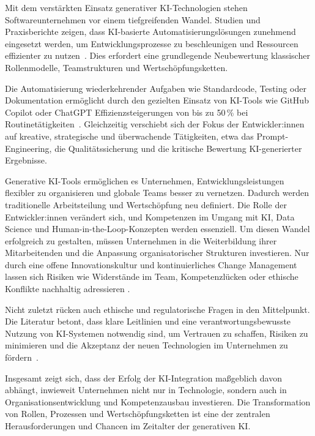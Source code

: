 Mit dem verstärkten Einsatz generativer KI-Technologien stehen
Softwareunternehmen vor einem tiefgreifenden Wandel. Studien und Praxisberichte
zeigen, dass KI-basierte Automatisierungslösungen zunehmend eingesetzt werden,
um Entwicklungsprozesse zu beschleunigen und Ressourcen effizienter zu
nutzen~\cite{siebert_generative_2024,braun_ki_2024}. Dies erfordert eine
grundlegende Neubewertung klassischer Rollenmodelle, Teamstrukturen und
Wertschöpfungsketten.

Die Automatisierung wiederkehrender Aufgaben wie Standardcode, Testing oder
Dokumentation ermöglicht durch den gezielten Einsatz von KI-Tools wie GitHub
Copilot oder ChatGPT Effizienzsteigerungen von bis zu 50\,\% bei
Routinetätigkeiten~\cite{braun_ki_2024,siebert_generative_2024}. Gleichzeitig
verschiebt sich der Fokus der Entwickler:innen auf kreative, strategische und
überwachende Tätigkeiten, etwa das Prompt-Engineering, die Qualitätssicherung
und die kritische Bewertung KI-generierter Ergebnisse.

Generative KI-Tools ermöglichen es Unternehmen, Entwicklungsleistungen
flexibler zu organisieren und globale Teams besser zu vernetzen. Dadurch werden
traditionelle Arbeitsteilung und Wertschöpfung neu definiert. Die Rolle der
Entwickler:innen verändert sich, und Kompetenzen im Umgang mit KI, Data Science
und Human-in-the-Loop-Konzepten werden essenziell. Um diesen Wandel erfolgreich
zu gestalten, müssen Unternehmen in die Weiterbildung ihrer Mitarbeitenden und
die Anpassung organisatorischer Strukturen investieren. Nur durch eine offene
Innovationskultur und kontinuierliches Change Management lassen sich Risiken
wie Widerstände im Team, Kompetenzlücken oder ethische Konflikte nachhaltig
adressieren \cite{s_future_2024}.

Nicht zuletzt rücken auch ethische und regulatorische Fragen in den
Mittelpunkt. Die Literatur betont, dass klare Leitlinien und eine
verantwortungsbewusste Nutzung von KI-Systemen notwendig sind, um Vertrauen zu
schaffen, Risiken zu minimieren und die Akzeptanz der neuen Technologien im
Unternehmen zu fördern~\cite{siebert_generative_2024}.

Insgesamt zeigt sich, dass der Erfolg der KI-Integration maßgeblich davon
abhängt, inwieweit Unternehmen nicht nur in Technologie, sondern auch in
Organisationsentwicklung und Kompetenzausbau investieren. Die Transformation
von Rollen, Prozessen und Wertschöpfungsketten ist eine der zentralen
Herausforderungen und Chancen im Zeitalter der generativen KI.

